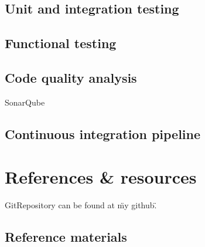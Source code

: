 \documentclass[12pt]{article}
\begin{document}
\subsection{Unit and integration testing}

\subsection{Functional testing}

\subsection{Code quality analysis}

SonarQube

\subsection{Continuous integration pipeline}

\section{References \& resources}

GitRepository can be found at \"my github\".

\subsection{Reference materials}
\end{document}
